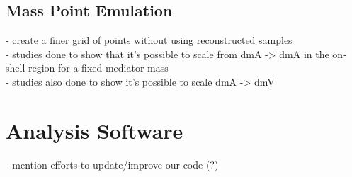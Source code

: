 \subsection{Mass Point Emulation}

- create a finer grid of points without using reconstructed samples\\
- studies done to show that it's possible to scale from dmA -> dmA in the on-shell region for a fixed mediator mass\\
- studies also done to show it's possible to scale dmA -> dmV\\

\section{Analysis Software}
\label{sec:code}
- mention efforts to update/improve our code (?)